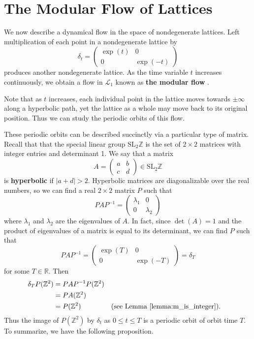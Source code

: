\documentclass[12pt,twoside]{reedthesis}
\theoremstyle{definition}
\newcommand{\Z}{\mathbb{Z}}
\newcommand{\R}{\mathbb{R}}
\newcommand{\LS}{\mathcal{L}}
\newcommand{\SLZ}{\mathrm{SL}_2{\Z}}
\newcommand{\defnphrase}[1]{\textbf{#1}}
\begin{document}
\section{The Modular Flow of Lattices}\label{subsec:lattice_flow}

We now describe a dynamical flow in the space of nondegenerate lattices.
Left multiplication of each point in a nondegenerate lattice by
\begin{equation}\label{eq:delta_t}
  \delta_t = \begin{pmatrix}
    \exp(t) & 0 \\
    0 & \exp(-t)
  \end{pmatrix}
\end{equation}
produces another nondegenerate lattice.
As the time variable $t$ increases continuously, we obtain a flow in $\LS_1$ known as \defnphrase{the modular flow} \cite{ghys2007, touristguide, ncatcafe}.
  
Note that as $t$ increases, each individual point in the lattice moves towards $\pm \infty$ along a hyperbolic path, yet the lattice as a whole may move back to its original position.
Thus we can study the periodic orbits of this flow. 

These periodic orbits can be described succinctly via a particular type of matrix.
Recall that that the special linear group $\SLZ$ is the set of $2 \times 2$ matrices with integer entries and determinant 1.
We say that a matrix
\begin{equation*}
  A = \begin{pmatrix}
    a & b \\
    c & d
  \end{pmatrix} \in \SLZ
\end{equation*}
is \defnphrase{hyperbolic} if $|a + d| > 2$.
Hyperbolic matrices are diagonalizable over the real numbers, so we can find a real $2 \times 2$ matrix $P$ such that
\begin{equation*}
  PAP^{-1} = \begin{pmatrix}
    \lambda_1 & 0 \\
    0 & \lambda_2
  \end{pmatrix}
\end{equation*}
where $\lambda_1$ and $\lambda_2$ are the eigenvalues of $A$.
In fact, since $\det(A) = 1$ and the product of eigenvalues of a matrix is equal to its determinant, we can find $P$ such that
\begin{equation*}
  PAP^{-1} = \begin{pmatrix}
    \exp(T) & 0 \\
    0 & \exp(-T)
  \end{pmatrix} = \delta_T
\end{equation*}
for some $T \in \R$.
Then
\begin{align*}
  \delta_{T}P(\Z^2) &= PAP^{-1} P(\Z^2) \\
  &= PA(\Z^2) \\
  &= P(\Z^2) && \text{(see Lemma~\ref{lemma:m_is_integer}).}
\end{align*}
Thus the image of $P(\Z^2)$ by $\delta_t$ as $0 \leq t \leq T$ is a periodic orbit of orbit time $T$.
To summarize, we have the following proposition.
\end{document}
